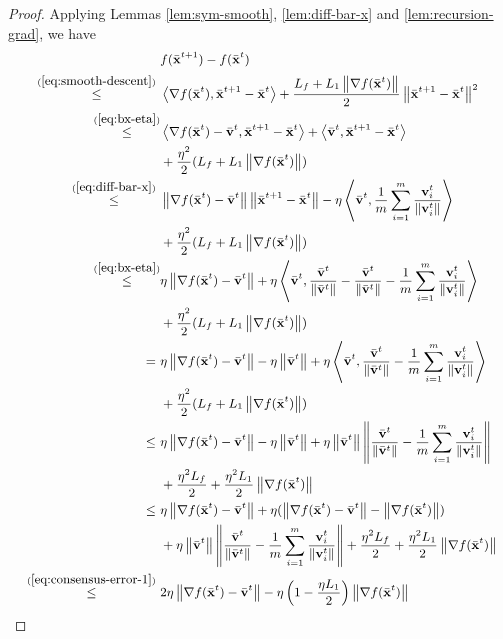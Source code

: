 \documentclass[sigconf]{acmart}
\newcommand{\Norm}[1]{\left\| #1 \right\|}
\def\inner#1#2{\left\langle #1, #2 \right\rangle}
\def\vv{{\bf{v}}}
\def\vx{{\bf{x}}}
\theoremstyle{plain}
\def\bx{{\bar\vx}}
\def\bv{{\bar\vv}}
\begin{document}
\begin{proof}
Applying Lemmas \ref{lem:sym-smooth}, \ref{lem:diff-bar-x} and \ref{lem:recursion-grad}, we have
\begin{align}  
\label{eq:descent-mean-2}\small\begin{split}
   &  f(\bx^{t+1}) - f(\bx^t)  \\
\overset{~(\ref{eq:smooth-descent})~}{\leq} &  \inner{\nabla f(\bx^t)}{\bx^{t+1}-\bx^t} + \frac{L_f+L_1\Norm{\nabla f(\bx^t)}}{2}\Norm{\bx^{t+1}-\bx^t}^2 \\
\overset{(\ref{eq:bx-eta})}{\leq} &  \inner{\nabla f(\bx^t)-\bv^t}{\bx^{t+1}-\bx^t}
+ \inner{\bv^t}{\bx^{t+1}-\bx^t} \\
& + \frac{\eta^2}{2}(L_f+L_1\Norm{\nabla f(\bx^t)}) \\
\overset{~(\ref{eq:diff-bar-x})~}{\leq} &  \Norm{\nabla f(\bx^t)-\bv^t}\Norm{\bx^{t+1}-\bx^t}
- \eta\inner{\bv^t}{\frac{1}{m}\sum_{i=1}^m \frac{\vv_i^t}{\Norm{\vv_i^t}}} \\
& + \frac{\eta^2}{2}(L_f+L_1\Norm{\nabla f(\bx^t)}) \\
\overset{(\ref{eq:bx-eta})}{\leq} &  \eta\Norm{\nabla f(\bx^t)-\bv^t}
+ \eta\inner{\bv^t}{\frac{\bv^t}{\Norm{\bv^t}} - \frac{\bv^t}{\Norm{\bv^t}} - \frac{1}{m}\sum_{i=1}^m \frac{\vv_i^t}{\Norm{\vv_i^t}}} \\
& + \frac{\eta^2}{2}(L_f+L_1\Norm{\nabla f(\bx^t)}) \\
~=~ &  \eta\Norm{\nabla f(\bx^t)-\bv^t} - \eta\Norm{\bv^t} 
+ \eta\inner{\bv^t}{\frac{\bv^t}{\Norm{\bv^t}} -  \frac{1}{m}\sum_{i=1}^m \frac{\vv_i^t}{\Norm{\vv_i^t}}} \\
& + \frac{\eta^2}{2}(L_f+L_1\Norm{\nabla f(\bx^t)}) \\
~\leq~ & \eta\Norm{\nabla f(\bx^t)-\bv^t} - \eta\Norm{\bv^t} 
+ \eta\Norm{\bv^t}\Norm{\frac{\bv^t}{\Norm{\bv^t}} -  \frac{1}{m}\sum_{i=1}^m \frac{\vv_i^t}{\Norm{\vv_i^t}}} \\
& + \frac{\eta^2L_f}{2} + \frac{\eta^2L_1}{2}\Norm{\nabla f(\bx^t)} \\
~\leq~ & \eta\Norm{\nabla f(\bx^t)-\bv^t} + \eta(\Norm{\nabla f(\bx^t)-\bv^t} - \Norm{\nabla f(\bx^t)}) \\
& + \eta\Norm{\bv^t}\Norm{\frac{\bv^t}{\Norm{\bv^t}} - \frac{1}{m}\sum_{i=1}^m \frac{\vv_i^t}{\Norm{\vv_i^t}}}
+ \frac{\eta^2L_f}{2} + \frac{\eta^2L_1}{2}\Norm{\nabla f(\bx^t)} \\
\overset{~(\ref{eq:consensus-error-1})~}{\leq} & 2\eta\Norm{\nabla f(\bx^t)-\bv^t} - \eta\left(1 - \frac{\eta L_1}{2}\right) \Norm{\nabla f(\bx^t)} \\

\end{split}
\end{align}
\end{proof}
\end{document}
